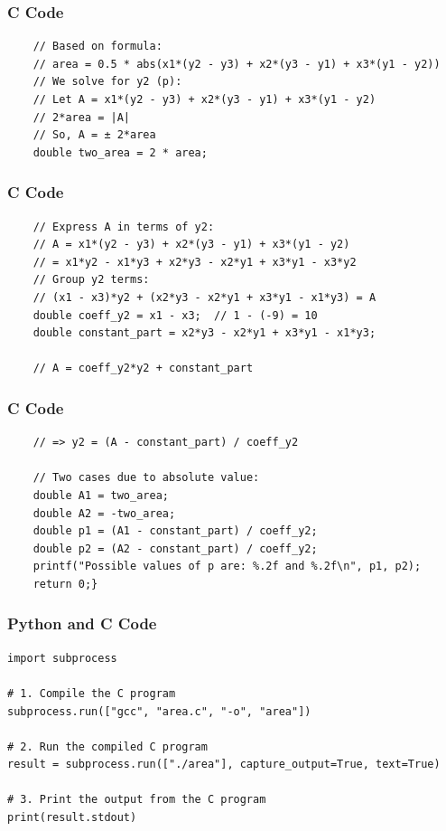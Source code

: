 \documentclass{beamer}
\begin{document}
\begin{frame}[fragile]
\frametitle{C Code}
\begin{lstlisting}
    // Based on formula:
    // area = 0.5 * abs(x1*(y2 - y3) + x2*(y3 - y1) + x3*(y1 - y2))
    // We solve for y2 (p):
    // Let A = x1*(y2 - y3) + x2*(y3 - y1) + x3*(y1 - y2)
    // 2*area = |A|
    // So, A = ± 2*area
    double two_area = 2 * area;
\end{lstlisting}
\end{frame}

\begin{frame}[fragile]
\frametitle{C Code}
\begin{lstlisting}
    // Express A in terms of y2:
    // A = x1*(y2 - y3) + x2*(y3 - y1) + x3*(y1 - y2)
    // = x1*y2 - x1*y3 + x2*y3 - x2*y1 + x3*y1 - x3*y2
    // Group y2 terms:
    // (x1 - x3)*y2 + (x2*y3 - x2*y1 + x3*y1 - x1*y3) = A
    double coeff_y2 = x1 - x3;  // 1 - (-9) = 10
    double constant_part = x2*y3 - x2*y1 + x3*y1 - x1*y3;

    // A = coeff_y2*y2 + constant_part
\end{lstlisting}
\end{frame}

\begin{frame}[fragile]
\frametitle{C Code}
\begin{lstlisting}
    // => y2 = (A - constant_part) / coeff_y2

    // Two cases due to absolute value:
    double A1 = two_area;
    double A2 = -two_area;
    double p1 = (A1 - constant_part) / coeff_y2;
    double p2 = (A2 - constant_part) / coeff_y2;
    printf("Possible values of p are: %.2f and %.2f\n", p1, p2);
    return 0;}

\end{lstlisting}

\end{frame}


\begin{frame}[fragile]
\frametitle{Python and C Code}

\begin{lstlisting}
import subprocess

# 1. Compile the C program
subprocess.run(["gcc", "area.c", "-o", "area"])

# 2. Run the compiled C program
result = subprocess.run(["./area"], capture_output=True, text=True)

# 3. Print the output from the C program
print(result.stdout)
\end{lstlisting}

\end{frame}
\end{document}
